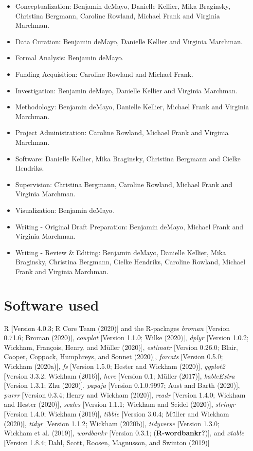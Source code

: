 \documentclass[
  english,
  ,man,floatsintext]{apa6}
\providecommand{\tightlist}{%
  \setlength{\itemsep}{0pt}\setlength{\parskip}{0pt}}
\begin{document}
\begin{itemize}
\tightlist
\item
  Conceptualization: Benjamin deMayo, Danielle Kellier, Mika Braginsky, Christina Bergmann, Caroline Rowland, Michael Frank and Virginia Marchman.
\item
  Data Curation: Benjamin deMayo, Danielle Kellier and Virginia Marchman.
\item
  Formal Analysis: Benjamin deMayo.
\item
  Funding Acquisition: Caroline Rowland and Michael Frank.
\item
  Investigation: Benjamin deMayo, Danielle Kellier and Virginia Marchman.
\item
  Methodology: Benjamin deMayo, Danielle Kellier, Michael Frank and Virginia Marchman.
\item
  Project Administration: Caroline Rowland, Michael Frank and Virginia Marchman.
\item
  Software: Danielle Kellier, Mika Braginsky, Christina Bergmann and Cielke Hendriks.
\item
  Supervision: Christina Bergmann, Caroline Rowland, Michael Frank and Virginia Marchman.
\item
  Visualization: Benjamin deMayo.
\item
  Writing - Original Draft Preparation: Benjamin deMayo, Michael Frank and Virginia Marchman.
\item
  Writing - Review \& Editing: Benjamin deMayo, Danielle Kellier, Mika Braginsky, Christina Bergmann, Cielke Hendriks, Caroline Rowland, Michael Frank and Virginia Marchman.
\end{itemize}

\hypertarget{software-used}{%
\section{Software used}\label{software-used}}

R {[}Version 4.0.3; R Core Team (2020){]} and the R-packages \emph{broman} {[}Version 0.71.6; Broman (2020){]}, \emph{cowplot} {[}Version 1.1.0; Wilke (2020){]}, \emph{dplyr} {[}Version 1.0.2; Wickham, François, Henry, and Müller (2020){]}, \emph{estimatr} {[}Version 0.26.0; Blair, Cooper, Coppock, Humphreys, and Sonnet (2020){]}, \emph{forcats} {[}Version 0.5.0; Wickham (2020a){]}, \emph{fs} {[}Version 1.5.0; Hester and Wickham (2020){]}, \emph{ggplot2} {[}Version 3.3.2; Wickham (2016){]}, \emph{here} {[}Version 0.1; Müller (2017){]}, \emph{kableExtra} {[}Version 1.3.1; Zhu (2020){]}, \emph{papaja} {[}Version 0.1.0.9997; Aust and Barth (2020){]}, \emph{purrr} {[}Version 0.3.4; Henry and Wickham (2020){]}, \emph{readr} {[}Version 1.4.0; Wickham and Hester (2020){]}, \emph{scales} {[}Version 1.1.1; Wickham and Seidel (2020){]}, \emph{stringr} {[}Version 1.4.0; Wickham (2019){]}, \emph{tibble} {[}Version 3.0.4; Müller and Wickham (2020){]}, \emph{tidyr} {[}Version 1.1.2; Wickham (2020b){]}, \emph{tidyverse} {[}Version 1.3.0; Wickham et al. (2019){]}, \emph{wordbankr} {[}Version 0.3.1; (\textbf{R-wordbankr?}){]}, and \emph{xtable} {[}Version 1.8.4; Dahl, Scott, Roosen, Magnusson, and Swinton (2019){]}
\end{document}
